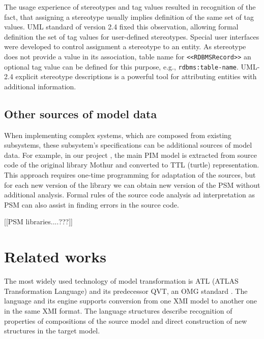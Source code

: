 \documentclass[conference]{IEEEtran}
\begin{document}
The usage experience of stereotypes and tag values resulted in recognition of the fact, that assigning a stereotype usually implies definition of the same set of tag values.  UML standard of version 2.4 fixed this observation, allowing formal definition the set of tag values for user-defined stereotypes.  Special user interfaces were developed to control assignment a stereotype to an entity.  As stereotype does not provide a value in its association, table name for \texttt{<<RDBMSRecord>>} an optional tag value can be defined for this purpose, e.g., \texttt{rdbms:table-name}.  UML-2.4 explicit stereotype descriptions is a powerful tool for attributing entities with additional information.


\subsection{Other sources of model data}
\label{sec:other-models}

When implementing complex systems, which are composed from existing subsystems, these subsystem's specifications can be additional sources of model data.  For example, in our project \cite{bit2019}, the main PIM model is extracted from source code of the original library Mothur and converted to TTL (turtle) representation.  This approach requires one-time programming for adaptation of the sources, but for each new version of the library we can obtain new version of the PSM without additional analysis.  Formal rules of the source code analysis ad interpretation as PSM can also assist in finding errors in the source code.

[[PSM libraries....???]]


\section{Related works}

The most widely used technology of model transformation is ATL (ATLAS Transformation Language) \cite{atl} and its predecessor QVT, an OMG standard \cite{QVT}.  The language and its engine supports conversion from one XMI model to another one in the same XMI format.  The language structures describe recognition of properties of compositions of the source model and direct construction of new structures in the target model.
\end{document}

